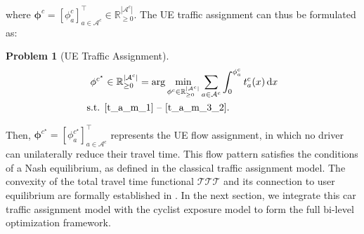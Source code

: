 \documentclass[letterpaper, 10 pt, conference]{ieeeconf}  %
\newtheorem{problem}{\normalfont\textbf{Problem}}
\begin{document}
where $\boldsymbol{\phi}^{c} = \left[\phi_a^c\right]_{a \in \mathcal{A}^c}^\top \in \mathbb{R}_{\geq 0}^{|\mathcal{A}^c|}$. The UE traffic assignment can thus be formulated as:
\begin{problem}[UE Traffic Assignment]
\label{UE_tp}
\begin{align*}
\mathbf{\phi}^{c^{\star}} &\in \mathbb{R}_{\geq 0}^{|\mathcal{A}^{c}|} = \arg\min_{\mathbf{\phi}^{c} \in \mathbb{R}_{\geq 0}^{|\mathcal{A}^{c}|}}  
   \sum_{a \in \mathcal{A}^{c}} \int_{0}^{\phi_{a}^{c}} t_a^{c}(x) \, \mathrm{d}x \\
   \text{s.t. } & \text{\eqref{t_a_m_1}~--~\eqref{t_a_m_3_2}}. \nonumber
\end{align*}
\end{problem}
Then, $\boldsymbol{\phi}^{c^{\star}} = \left[\phi_a^{c^{\star}}\right]_{a \in \mathcal{A}^{c}}^\top$ represents the UE flow assignment, in which no driver can unilaterally reduce their travel time. This flow pattern satisfies the conditions of a Nash equilibrium, as defined in the classical traffic assignment model. The convexity of the total travel time functional 
 $\mathcal{TTT}$ and its connection to user equilibrium are formally established in \cite{beckmann1956studies}. In the next section, we integrate this car traffic assignment model with the cyclist exposure model to form the full bi-level optimization framework.



\end{document}
